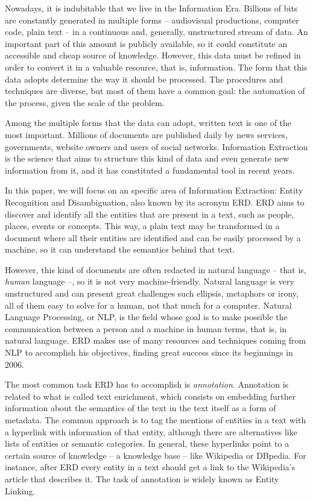 Nowadays, it is indubitable that we live in the Information Era. Billions of bits are constantly generated in multiple forms -- audiovisual productions, computer code, plain text -- in a continuous and, generally, unstructured stream of data. An important part of this amount is publicly available, so it could constitute an accessible and cheap source of knowledge. However, this data must be refined in order to convert it in a valuable resource, that is, information. The form that this data adopts determine the way it should be processed. The procedures and techniques are diverse, but most of them have a common goal: the automation of the process, given the scale of the problem.

Among the multiple forms that the data can adopt, written text is one of the most important. Millions of documents are published daily by news services, governments, website owners and users of social networks. Information Extraction is the science that aims to structure this kind of data and even generate new information from it, and it has constituted a fundamental tool in recent years.

In this paper, we will focus on an specific area of Information Extraction: Entity Recognition and Disambiguation, also known by its acronym ERD. ERD aims to discover and identify all the entities that are present in a text, such as people, places, events or concepts. This way, a plain text may be transformed in a document where all their entities are identified and can be easily processed by a machine, so it can understand the semantics behind that text.

However, this kind of documents are often redacted in natural language -- that is, \emph{human} language --, so it is not very machine-friendly. Natural language is very unstructured and can present great challenges such ellipsis, metaphors or irony, all of them easy to solve for a human, not that much for a computer. Natural Language Processing, or NLP, is the field whose goal is to make possible the communication between a person and a machine in human terms, that is, in natural language. ERD makes use of many resources and techniques coming from NLP to accomplish his objectives, finding great success since its beginnings in 2006.

The most common task ERD has to accomplish is \emph{annotation}. Annotation is related to what is called text enrichment, which consists on embedding further information about the semantics of the text in the text itself as a form of metadata. The common approach is to tag the mentions of entities in a text with a hyperlink with information of that entity, although there are alternatives like lists of entities or semantic categories. In general, these hyperlinks point to a certain source of knowledge -- a knowledge base -- like Wikipedia or DBpedia. For instance, after ERD every entity in a text should get a link to the Wikipedia's article that describes it. The task of annotation is widely known as Entity Linking.

